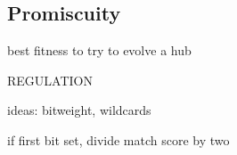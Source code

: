 \subsection{Promiscuity}

best fitness to try to evolve a hub

REGULATION

ideas: bitweight, wildcards

if first bit set, divide match score by two
